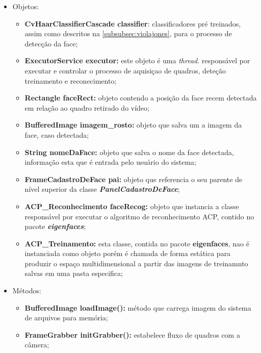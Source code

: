 \begin{itemize}
	\item Objetos:
	\begin{itemize}
		\item \textbf{CvHaarClassifierCascade classifier}: classificadores pré treinados, assim como descritos na \autoref{subsubsec:violajones}, para o processo de detecção da face;
		
		\item \textbf{ExecutorService executor:} este objeto é uma \textit{thread}. responsável por executar e controlar o processo de aquisiçao de quadros, deteção treinamento e reconecimento;
		
		\item \textbf{Rectangle faceRect:} objeto contendo a posição da face recem detectada em relação ao quadro retirado do vídeo;
		
		\item \textbf{BufferedImage imagem\_rosto:} objeto que salva um a imagem da face, caso detectada;
		
		\item \textbf{String nomeDaFace:} objeto que salva o nome da face detectada, informação esta que é entrada pelo usuário do sistema;
		
		\item \textbf{FrameCadastroDeFace pai:} objeto que referencia o seu parente de nível superior da classe \textbf{\textit{PanelCadastroDeFace}};
		
		\item \textbf{ACP\_Reconhecimento faceRecog:} objeto que instancia a classe responsável por executar o algoritmo de reconhecimento ACP, contido no pacote \textbf{\textit{eigenfaces}};
		
		\item \textbf{ACP\_Treinamento:} esta classe, contida no pacote \textbf{eigenfaces}, nao é instanciada como objeto porém é chamada de forma estática para produzir o espaço multidimensional a partir das imagens de treinamnto salvas em uma pasta especifica;
		
	\end{itemize}
	
	\item Métodos:
	\begin{itemize}
		\item \textbf{BufferedImage loadImage():} método que carrega imagem do sistema de arquivos para memória;
		
		\item \textbf{FrameGrabber initGrabber():} estabelece fluxo de quadros com a câmera;
		

\end{itemize}
\end{itemize}
